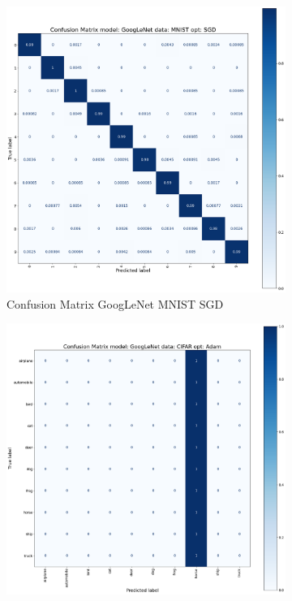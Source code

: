 \documentclass[conference]{IEEEtran}
\begin{document}
\begin{figure}[!htbp]
\begin{subfigure}[b]{0.22\textwidth}
        \includegraphics[width=\textwidth]{img/matrix_GoogLeNet_MNIST_SGD.png}
        \caption{Confusion Matrix GoogLeNet MNIST SGD}
        \label{fig:x matrix_GoogLeNet_MNIST_SGD}
    \end{subfigure}
    \begin{subfigure}[b]{0.22\textwidth}
        \centering
        \includegraphics[width=\textwidth]{img/matrix_GoogLeNet_CIFAR_adam.png}

\end{subfigure}
\end{figure}
\end{document}
